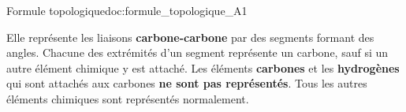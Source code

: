 \begin{doc}{Formule topologique}{doc:formule_topologique_A1}
  \begin{encart}  
    Elle représente les liaisons \textbf{carbone-carbone } par des segments formant des angles.
    Chacune des extrémités d'un segment représente un carbone, sauf si un autre élément chimique y est attaché.
    Les éléments \textbf{carbones} et les \textbf{hydrogènes} qui sont attachés aux carbones \textbf{ne sont pas représentés}.
    Tous les autres éléments chimiques sont représentés normalement.
  \end{encart}

  \exemples
  \vspace*{-20pt}
  \begin{center}
    \qq{}
    \qq{}
  \end{center}
  \begin{center}
    \qq{}
    \qq{}
  \end{center}
\end{doc}